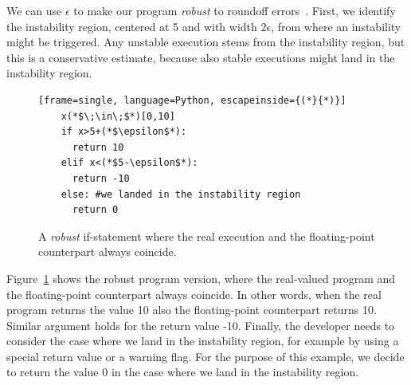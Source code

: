 We can use $\epsilon$ to make our program \emph{robust} to roundoff errors~\cite{guardstable}.
%
First, we identify the instability region, centered at 5 and with width $2\epsilon$, from where an instability might be triggered.
%
Any unstable execution stems from the instability region, but this is a conservative estimate, because also stable executions might land in the instability region.
%
\begin{figure}[tb!]
	\begin{lstlisting}[frame=single, language=Python, escapeinside={(*}{*)}]
	x(*$\;\in\;$*)[0,10]
	if x>5+(*$\epsilon$*):
	  return 10
	elif x<(*$5-\epsilon$*):
	  return -10
	else: #we landed in the instability region
	  return 0
	\end{lstlisting}
	\caption{A \emph{robust} if-statement where the real execution and the floating-point counterpart always coincide.}
	\label{fig:ifrobust}
\end{figure}
%
Figure~\ref{fig:ifrobust} shows the robust program version, where the real-valued program and the floating-point counterpart always coincide. 
%
In other words, when the real program returns the value 10 also the floating-point counterpart returns 10. Similar argument holds for the return value -10.
%
Finally, the developer needs to consider the case where we land in the instability region, for example by using a special return value or a warning flag.
%
For the purpose of this example, we decide to return the value $0$ in the case where we land in the instability region. 

%

